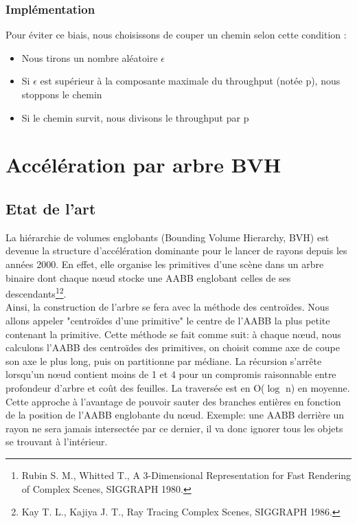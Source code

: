 \subsubsection{Implémentation}

Pour éviter ce biais, nous choisissons de couper un chemin selon cette condition :
\begin{itemize}
	\item[$\bullet$] Nous tirons un nombre aléatoire $\epsilon$
	\item[$\bullet$] Si $\epsilon$ est supérieur à la composante maximale du throughput (notée p), nous stoppons le chemin
	\item[$\bullet$] Si le chemin survit, nous divisons le throughput par p
\end{itemize}


\section{Accélération par arbre BVH}
\subsection{Etat de l'art}
La hiérarchie de volumes englobants (Bounding Volume Hierarchy, BVH) est devenue la structure d'accélération dominante pour le lancer de rayons depuis les années 2000. En effet, elle organise les primitives d'une scène dans un arbre binaire dont chaque n\oe ud stocke une AABB englobant celles de ses descendants\footnote{Rubin S. M., Whitted T., A 3-Dimensional Representation for Fast Rendering of Complex Scenes, SIGGRAPH 1980.
}\footnote{Kay T. L., Kajiya J. T., Ray Tracing Complex Scenes, SIGGRAPH 1986.}.\\
Ainsi, la construction de l'arbre se fera avec la méthode des centroïdes. Nous allons appeler "centroïdes d'une primitive" le centre de l'AABB la plus petite contenant la primitive. Cette méthode se fait comme suit: à chaque n\oe ud, nous calculons l'AABB des centroïdes des primitives, on choisit comme axe de coupe son axe le plus long, puis on partitionne par médiane. La récursion s'arrête lorsqu'un n\oe ud contient moins de 1 et 4 pour un compromis raisonnable entre profondeur d'arbre et coût des feuilles. La traversée est en O($\log$ n) en moyenne.\\
Cette approche à l'avantage de pouvoir sauter des branches entières en fonction de la position de l'AABB englobante du n\oe ud. Exemple: une AABB derrière un rayon ne sera jamais intersectée par ce dernier, il va donc ignorer tous les objets se trouvant à l'intérieur.
